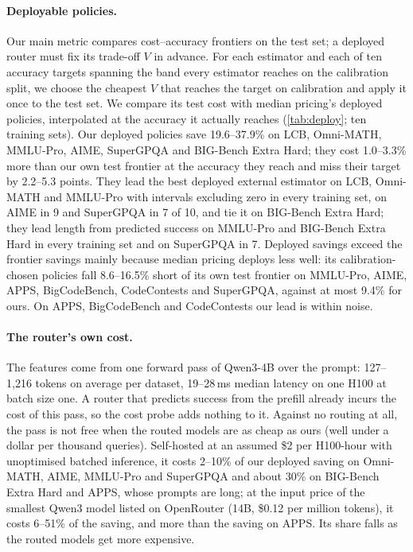 \documentclass[10pt]{article}
\begin{document}
\paragraph{Deployable policies.}
Our main metric compares cost--accuracy frontiers on the test set; a deployed router must fix its trade-off $V$ in advance. For each estimator and each of ten accuracy targets spanning the band every estimator reaches on the calibration split, we choose the cheapest $V$ that reaches the target on calibration and apply it once to the test set. We compare its test cost with median pricing's deployed policies, interpolated at the accuracy it actually reaches (\cref{tab:deploy}; ten training sets). Our deployed policies save 19.6--37.9\% on LCB, Omni-MATH, MMLU-Pro, AIME, SuperGPQA and BIG-Bench Extra Hard; they cost 1.0--3.3\% more than our own test frontier at the accuracy they reach and miss their target by 2.2--5.3 points. They lead the best deployed external estimator on LCB, Omni-MATH and MMLU-Pro with intervals excluding zero in every training set, on AIME in 9 and SuperGPQA in 7 of 10, and tie it on BIG-Bench Extra Hard; they lead length from predicted success on MMLU-Pro and BIG-Bench Extra Hard in every training set and on SuperGPQA in 7. Deployed savings exceed the frontier savings mainly because median pricing deploys less well: its calibration-chosen policies fall 8.6--16.5\% short of its own test frontier on MMLU-Pro, AIME, APPS, BigCodeBench, CodeContests and SuperGPQA, against at most 9.4\% for ours. On APPS, BigCodeBench and CodeContests our lead is within noise.



\paragraph{The router's own cost.}
The features come from one forward pass of Qwen3-4B over the prompt: 127--1,216 tokens on average per dataset, 19--28\,ms median latency on one H100 at batch size one. A router that predicts success from the prefill already incurs the cost of this pass, so the cost probe adds nothing to it. Against no routing at all, the pass is not free when the routed models are as cheap as ours (well under a dollar per thousand queries). Self-hosted at an assumed \$2 per H100-hour with unoptimised batched inference, it costs 2--10\% of our deployed saving on Omni-MATH, AIME, MMLU-Pro and SuperGPQA and about 30\% on BIG-Bench Extra Hard and APPS, whose prompts are long; at the input price of the smallest Qwen3 model listed on OpenRouter (14B, \$0.12 per million tokens), it costs 6--51\% of the saving, and more than the saving on APPS. Its share falls as the routed models get more expensive.
\end{document}
